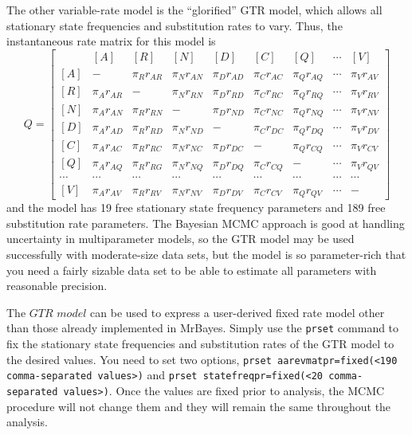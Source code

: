 \documentclass[12pt]{book}
\begin{document}
The other variable-rate model is the ``glorified'' GTR model, which allows all stationary state
frequencies and substitution rates to vary. Thus, the instantaneous rate matrix for this model is
\footnotesize
\[
Q=\begin{bmatrix}
    & [A] & [R] & [N] & [D] & [C] & [Q] & \cdots & [V]\\
 [A]& - & \pi_{R} r_{AR}& \pi_{N} r_{AN} & \pi_{D} r_{AD}& \pi_{C} r_{AC}& \pi_{Q} r_{AQ} & \cdots & \pi_V r_{AV}\\
 [R]& \pi_{A} r_{AR} &- &  \pi_{N}  r_{RN}& \pi_{D} r_{RD}& \pi_{C} r_{RC}& \pi_{Q} r_{RQ} & \cdots & \pi_V r_{RV}\\
 [N]& \pi_{A} r_{AN}&\pi_{R} r_{RN}&- &   \pi_{D} r_{ND}& \pi_{C} r_{NC}& \pi_{Q} r_{NQ} & \cdots & \pi_V r_{NV}\\
 [D]& \pi_{A} r_{AD} &\pi_{R} r_{RD} &  \pi_{N} r_{ND}&- &  \pi_{C} r_{DC}& \pi_{Q} r_{DQ} & \cdots & \pi_V r_{DV}\\
 [C]& \pi_{A} r_{AC} &\pi_{R} r_{RC} &  \pi_{N} r_{NC}&  \pi_{D} r_{DC}&- & \pi_{Q} r_{CQ} & \cdots & \pi_V r_{CV}\\
 [Q]& \pi_{A} r_{AQ} &\pi_{R} r_{RG} &  \pi_{N} r_{NQ}&  \pi_{D} r_{DQ}& \pi_{C} r_{CQ} &- & \cdots & \pi_V r_{QV}\\
 \cdots& \cdots& \cdots& \cdots& \cdots& \cdots& \cdots& \cdots& \cdots\\
 [V]& \pi_{A} r_{AV} &\pi_{R} r_{RV} &  \pi_{N} r_{NV}&  \pi_{D} r_{DV}& \pi_{C} r_{CV} &\pi_Q r_{QV}& \cdots & -
\end{bmatrix}
\]
\normalsize
and the model has 19 free stationary state frequency parameters and 189 free substitution rate
parameters. The Bayesian MCMC approach is good at handling uncertainty in multiparameter models, so
the GTR model may be used successfully with moderate-size data sets, but the model is so
parameter-rich that you need a fairly sizable data set to be able to estimate all parameters with
reasonable precision.

The $GTR$ $model$ can be used to express a user-derived fixed rate model other than those already
implemented in MrBayes. Simply use the \texttt{prset} command to fix the stationary state
frequencies and substitution rates of the GTR model to the desired values. You need to set two
options, \texttt{prset aarevmatpr=fixed(<190 comma-separated values>)} and \texttt{prset
statefreqpr=fixed(<20 comma-separated values>)}. Once the values are fixed prior to analysis, the
MCMC procedure will not change them and they will remain the same throughout the analysis.
\end{document}
